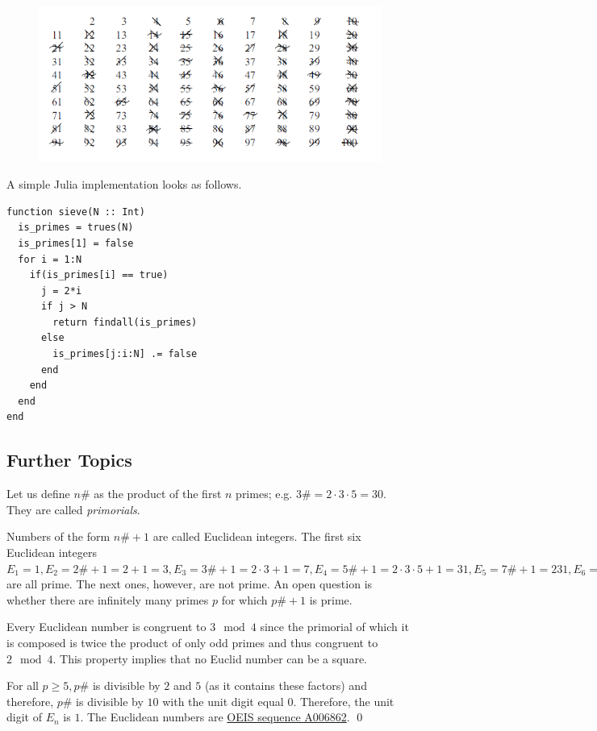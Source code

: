 \begin{figure}[H]
    \centering
    \includegraphics[scale=0.75]{images/primes_01_01.png}
\end{figure}


A simple Julia implementation looks as follows.

\begin{verbatim}
function sieve(N :: Int)
  is_primes = trues(N)
  is_primes[1] = false
  for i = 1:N
    if(is_primes[i] == true)
      j = 2*i
      if j > N
        return findall(is_primes)
      else
        is_primes[j:i:N] .= false
      end
    end
  end
end
\end{verbatim}


\subsection{Further Topics}

Let us define $n \#$ as the product of the first $n$ primes; e.g. $3 \# = 2 \cdot 3 \cdot 5 = 30$. They are called \emph{primorials}.

Numbers of the form $n \# + 1$ are called Euclidean integers. The first six Euclidean integers $E_1 = 1, E_2 = 2 \# + 1= 2 + 1 = 3, E_3 = 3 \# + 1 = 2 \cdot 3 + 1 = 7, E_4 = 5 \# + 1 = 2 \cdot 3 \cdot 5 + 1 = 31, E_5 = 7 \# + 1 = 231, E_6 = 11 \# + 1 = 2311$ are all prime. The next ones, however, are not prime. An open question is whether there are infinitely many primes $p$ for which $p \# + 1$ is prime.

Every Euclidean number is congruent to $3 \mod 4$ since the primorial of which it is composed is twice the product of only odd primes and thus congruent to $2 \mod 4$. This property implies that no Euclid number can be a square. 

For all $p \geq 5, p \#$ is divisible by $2$ and $5$ (as it contains these factors) and therefore, $p \#$ is divisible by $10$ with the unit digit equal $0$. Therefore, the unit digit of $E_n$ is $1$. The Euclidean numbers are \href{https://oeis.org/A006862}{OEIS sequence A006862}. \qed


